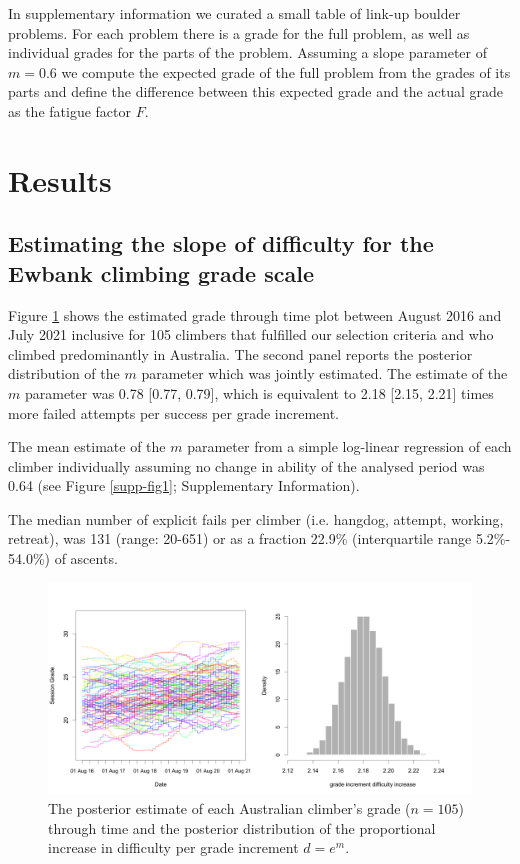 \documentclass{article}
\newcommand{\C}{105}
\newcommand{\meanm}{0.78}
\newcommand{\lowm}{0.77}
\newcommand{\highm}{0.79}
\newcommand{\meand}{2.18}
\newcommand{\lowd}{2.15}
\newcommand{\highd}{2.21}
\newcommand{\meanregm}{0.64}
\begin{document}
In supplementary information we curated a small table of link-up boulder problems. For each problem there is a grade for the full problem, as well as individual grades for the parts of the problem. Assuming a slope parameter of $m=0.6$ we compute the expected grade of the full problem from the grades of its parts and define the difference between this expected grade and the actual grade as the fatigue factor $F$.

\section*{Results}

\subsection*{Estimating the slope of difficulty for the Ewbank climbing grade scale}


Figure \ref{aus_ascents} shows the estimated grade through time plot between August 2016 and July 2021 inclusive for \C{} climbers that fulfilled our selection criteria and who climbed predominantly in Australia. The second panel reports the posterior distribution of the $m$ parameter which was jointly estimated.
The estimate of the $m$ parameter was \meanm{} [\lowm, \highm], which is equivalent to \meand{} [\lowd, \highd] times more failed attempts per success per grade increment. 

The mean estimate of the $m$ parameter from a simple log-linear regression of each climber individually assuming no change in ability of the analysed period was \meanregm{} (see Figure \ref{supp-fig1}; Supplementary Information). 

The median number of explicit fails per climber (i.e. \gls{hangdog}, attempt, working, retreat), was 131 (range: 20-651) or as a fraction 22.9\% (interquartile range 5.2\%- 54.0\%) of ascents.
\begin{figure}
\centering
\includegraphics[width=\textwidth]{../results/aus/ascents-from-2016-08-01-to-2021-08-01-minAscents400-minFails1-session-posterior.png}
\caption{\small The posterior estimate of each Australian climber's grade ($n=\C$) through time and the posterior distribution of the proportional increase in difficulty per grade increment $d = e^m$.}
\label{aus_ascents}
\end{figure}
\end{document}

